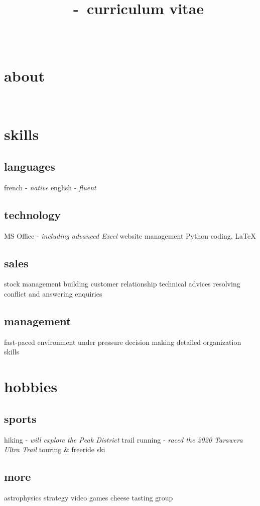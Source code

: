 \documentclass[a4paper]{farangoth-cv}
\newcommand*{\cvTitle}{curriculum vitae}
\begin{document}
\title{\myFirstName\ \myLastName\ \--\ \cvTitle}
\author{\myFirstName\ \myLastName}

\makeheader{}

\begin{aside}
  \section{about}\label{sec:about}
  \href{mailto:\myMail}{\myMail}
  \href{tel:\myPhoneNumber}{\myPhoneNumber}
  ~
  \myAddress{}

  \section{skills}
  \subsection{languages}
  french \-- \emph{native}
  english \-- \emph{fluent}

  \subsection{technology}
  MS Office \--  \emph{including advanced Excel}
  website management
  Python coding, \LaTeX%
  
  \subsection{sales}
  stock management
  building customer relationship
  technical advices
  resolving conflict and answering enquiries

  \subsection{management}
  fast-paced environment
  under pressure decision making
  detailed organization skills
    
  \section{hobbies}
  \subsection{sports}
  hiking \-- \emph{will explore the Peak District}
  trail running \-- \emph{raced the 2020 Tarawera Ultra Trail}
  touring \& freeride ski
  \subsection{more}
  astrophysics
  strategy video games
  cheese tasting group
\end{aside}
\end{document}
